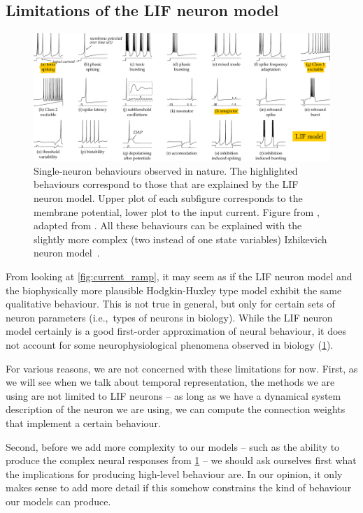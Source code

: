 \documentclass[10pt,letterpaper,oneside]{article}
\begin{document}
\subsection{Limitations of the LIF neuron model}

\begin{figure}
	\includegraphics[width=\textwidth]{media/izhikevich_whichmod_figure2.pdf}
	\caption{Single-neuron behaviours observed in nature. The highlighted behaviours correspond to those that are explained by the LIF neuron model. Upper plot of each subfigure corresponds to the membrane potential, lower plot to the input current. Figure from \cite{stoeckel2015design}, adapted from \cite{izhikevich2004model}. All these behaviours can be explained with the slightly more complex (two instead of one state variables) Izhikevich neuron model~\cite{izhikevich2003simple}.}
	\label{fig:izhikevich_whichmod_figure2}
\end{figure}

From looking at \cref{fig:current_ramp}, it may seem as if the LIF neuron model and the biophysically more plausible Hodgkin-Huxley type model exhibit the same qualitative behaviour. This is not true in general, but only for certain sets of neuron parameters (i.e.,~types of neurons in biology). While the LIF neuron model certainly is a good first-order approximation of neural behaviour, it does not account for some neurophysiological phenomena observed in biology (\cref{fig:izhikevich_whichmod_figure2}).

For various reasons, we are not concerned with these limitations for now. First, as we will see when we talk about temporal representation, the methods we are using are not limited to LIF neurons -- as long as we have a dynamical system description of the neuron we are using, we can compute the connection weights that implement a certain behaviour.

Second, before we add more complexity to our models -- such as the ability to produce the complex neural responses from \cref{fig:izhikevich_whichmod_figure2} -- we should ask ourselves first what the implications for producing high-level behaviour are. In our opinion, it only makes sense to add more detail if this somehow constrains the kind of behaviour our models can produce.
\end{document}
